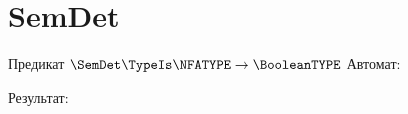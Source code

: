 \section{SemDet}
\begin{frame}{Предикат $\SemDet\TypeIs\NFATYPE\to\BooleanTYPE$}
	Автомат:


	Результат:

\end{frame}
